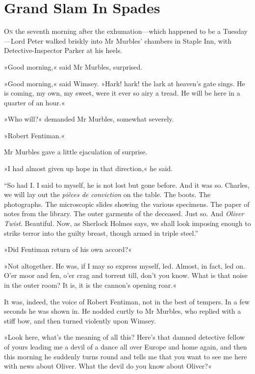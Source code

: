 \chapter{Grand Slam In Spades}

\lettrine[lines=4]{O}{n} the seventh morning after the exhumation\allowbreak---\allowbreak which happen\-ed to be a Tuesday\allowbreak---\allowbreak Lord Peter walked briskly into Mr Murb\-les' chambers in Staple Inn, with Detective-Inspector Parker at his heels.

»Good morning,« said Mr Murbles, surprised.

»Good morning,« said Wimsey. »Hark! hark! the lark at heaven's gate sings. He is coming, my own, my sweet, were it ever so airy a tread. He will be here in a quarter of an hour.«

»Who will?« demanded Mr Murbles, somewhat severely.

»Robert Fentiman.«

Mr Murbles gave a little ejaculation of surprise.

»I had almost given up hope in that direction,« he said.

\enquote{So had I. I said to myself, he is not lost but gone before. And it was so. Charles, we will lay out the \textit{pièces de conviction} on the table. The boots. The photographs. The microscopic slides showing the various specimens. The paper of notes from the library. The outer garments of the deceased. Just so. And \textit{Oliver Twist}. Beautiful. Now, as Sherlock Holmes says, we shall look imposing enough to strike terror into the guilty breast, though armed in triple steel.}

»Did Fentiman return of his own accord?«

»Not altogether. He was, if I may so express myself, led. Almost, in fact, led on. O'er moor and fen, o'er crag and torrent till, don't you know. What is that noise in the outer room? It is, it is the cannon's opening roar.«

It was, indeed, the voice of Robert Fentiman, not in the best of tempers. In a few seconds he was shown in. He nodded curtly to Mr Murbles, who replied with a stiff bow, and then turned violently upon Wimsey.

»Look here, what's the meaning of all this? Here's that damned detective fellow of yours leading me a devil of a dance all over Europe and home again, and then this morning he suddenly turns round and tells me that you want to see me here with news about Oliver. What the devil do you know about Oliver?«

